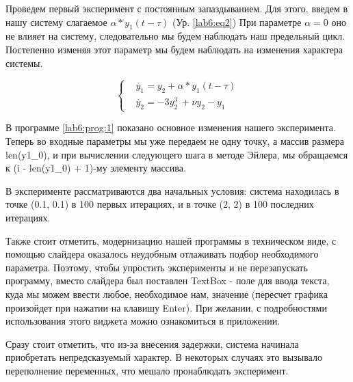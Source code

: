 Проведем первый эксперимент с постоянным запаздыванием.
Для этого, введем в нашу систему слагаемое $\alpha * y_1(t-\tau)$ (Ур. \ref{lab6:eq2})
При параметре $\alpha = 0$ оно не влияет на систему, следовательно мы будем
наблюдать наш предельный цикл. Постепенно изменяя этот параметр мы будем наблюдать
на изменения характера системы.

\begin{equation}\label{lab6:eq2}
\begin{cases}
    &\dot{y_1} = y_2 + \alpha * y_1(t-\tau)\\
    &\dot{y_2} = -3y_2^3\ + \nu y_2 - y_1
\end{cases}
\end{equation}

В программе \ref{lab6:prog:1} показано основное изменения нашего
эксперимента. Теперь во входные параметры мы уже передаем не
одну точку, а массив размера len(y1\_0), и при вычислении следующего
шага в методе Эйлера, мы обращаемся к (i - len(y1\_0) + 1)-му элементу массива.

В эксперименте рассматриваются два начальных условия: система находилась
в точке (0.1, 0.1) в 100 первых итерациях, и в точке (2, 2) в 100 последних итерациях.

Также стоит отметить, модернизацию нашей программы в техническом виде,
с помощью слайдера оказалось неудобным отлаживать подбор необходимого параметра.
Поэтому, чтобы упростить эксперименты и не перезапускать программу, вместо
слайдера был поставлен \textmd{TextBox} - поле для ввода текста, куда мы
можем ввести любое, необходимое нам, значение (пересчет графика произойдет при нажатии на клавишу
\textmd{Enter}). При желании, с подробностями использования этого виджета можно ознакомиться
в приложении.

\clearpage

Сразу стоит отметить, что из-за внесения задержки, система начинала приобретать
непредсказуемый характер. В некоторых случаях это вызывало переполнение переменных,
что мешало пронаблюдать эксперимент.



